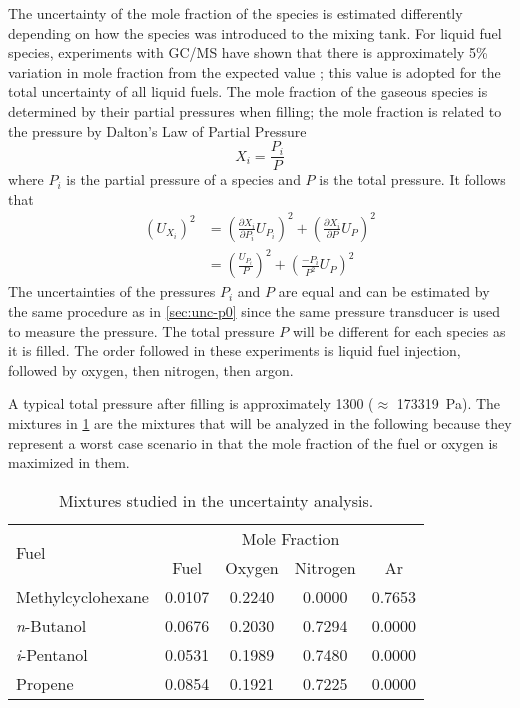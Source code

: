 \documentclass[../main.tex]{subfiles}
\begin{document}
The uncertainty of the mole fraction of the species is estimated differently
depending on how the species was introduced to the mixing tank. For liquid fuel
species, experiments with GC/MS have shown that there is approximately 5\%
variation in mole fraction from the expected value \cite{Weber2011}; this value is adopted for
the total uncertainty of all liquid fuels. The mole fraction of the gaseous species
is determined by their partial pressures when filling; the mole fraction is
related to the pressure by Dalton's Law of Partial Pressure
\cite{Dalton1801,Gillespie1930}
%
\begin{equation}
X_i = \frac{P_i}{P}
\end{equation}
%
where $P_i$ is the partial pressure of a species and $P$ is the total pressure.
It follows that
%
\begin{equation}
\begin{split}
\left(U_{X_i}\right)^2 &= \left(\frac{\partial X_i}{\partial P_i} U_{P_i}\right)^2 + \left(\frac{\partial X_i}{\partial P} U_P\right)^2 \\
&= \left(\frac{U_{P_i}}{P}\right)^2 + \left(\frac{{-P_i}}{P^2} U_P\right)^2
\end{split}
\end{equation}
%
The uncertainties of the pressures $P_i$ and $P$ are equal and can be estimated by
the same procedure as in \cref{sec:unc-p0} since the same pressure transducer
is used to measure the pressure. The total pressure $P$ will be different for
each species as it is filled. The order followed in these experiments is
liquid fuel injection, followed by oxygen, then nitrogen, then argon.

A typical total pressure after filling is
approximately \SI{1300}{\torr} ($\approx$ \SI{173319}{\pascal}). The mixtures in
\cref{tab:mixtures} are the mixtures that will be analyzed in the
following because they represent a worst case scenario in that the mole
fraction of the fuel or oxygen is maximized in them.

\begin{table}
\centering
\caption{Mixtures studied in the uncertainty analysis.}
\label{tab:mixtures}
\begin{tabular}{l *{4}{c}}
    \toprule
    \multirow{2}[0]{*}{Fuel} & \multicolumn{4}{c}{Mole Fraction} \\
         & Fuel & Oxygen & Nitrogen & Ar \\
    \midrule
    Methylcyclohexane   & 0.0107 & 0.2240 & 0.0000 & 0.7653 \\
    \textit{n}-Butanol  & 0.0676 & 0.2030 & 0.7294 & 0.0000 \\
    \textit{i}-Pentanol & 0.0531 & 0.1989 & 0.7480 & 0.0000 \\
    Propene             & 0.0854 & 0.1921 & 0.7225 & 0.0000 \\
    \bottomrule
    \end{tabular}
\end{table}
\end{document}
